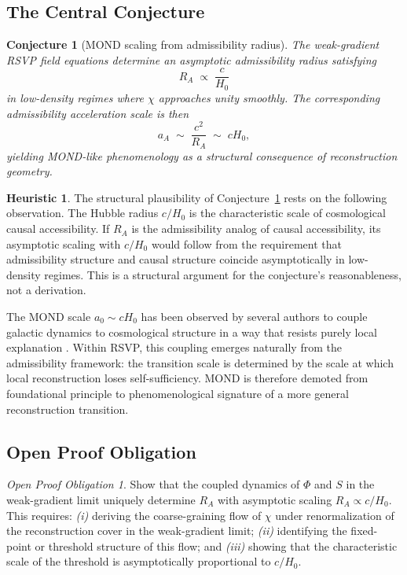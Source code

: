 \documentclass[11pt, a4paper]{article}
\theoremstyle{plain}
\newtheorem{conjecture}[theorem]{Conjecture}
\theoremstyle{definition}
\newtheorem{heuristic}[theorem]{Heuristic}
\theoremstyle{remark}
\newtheorem{obligation}[theorem]{Open Proof Obligation}
\newcommand{\RA}{R_{\!A}}
\newcommand{\aA}{a_{\!A}}
\begin{document}
\subsection{The Central Conjecture}

\begin{conjecture}[MOND scaling from admissibility radius]
\label{conj:RA}
The weak-gradient RSVP field equations determine an asymptotic admissibility radius
satisfying
\begin{equation}
  \RA \;\propto\; \frac{c}{H_0}
\end{equation}
in low-density regimes where $\chi$ approaches unity smoothly. The corresponding
admissibility acceleration scale is then
\begin{equation}
  \aA \;\sim\; \frac{c^2}{\RA} \;\sim\; cH_0,
\end{equation}
yielding MOND-like phenomenology as a structural consequence of reconstruction
geometry.
\end{conjecture}

\begin{heuristic}
The structural plausibility of Conjecture~\ref{conj:RA} rests on the following
observation. The Hubble radius $c/H_0$ is the characteristic scale of cosmological
causal accessibility. If $\RA$ is the admissibility analog of causal accessibility,
its asymptotic scaling with $c/H_0$ would follow from the requirement that
admissibility structure and causal structure coincide asymptotically in low-density
regimes. This is a structural argument for the conjecture's reasonableness, not a
derivation.
\end{heuristic}

The MOND scale $a_0 \sim cH_0$ has been observed by several authors to couple
galactic dynamics to cosmological structure in a way that resists purely local
explanation \cite{milgrom1983,famaey2012}. Within RSVP, this coupling emerges
naturally from the admissibility framework: the transition scale is determined by the
scale at which local reconstruction loses self-sufficiency. MOND is therefore demoted
from foundational principle to phenomenological signature of a more general
reconstruction transition.

\subsection{Open Proof Obligation}

\begin{obligation}
\label{obl:RA}
Show that the coupled dynamics of $\Phi$ and $S$ in the weak-gradient limit uniquely
determine $\RA$ with asymptotic scaling $\RA \propto c/H_0$. This requires:
\emph{(i)} deriving the coarse-graining flow of $\chi$ under renormalization of the
reconstruction cover in the weak-gradient limit; \emph{(ii)} identifying the
fixed-point or threshold structure of this flow; and \emph{(iii)} showing that the
characteristic scale of the threshold is asymptotically proportional to $c/H_0$.
\end{obligation}
\end{document}
